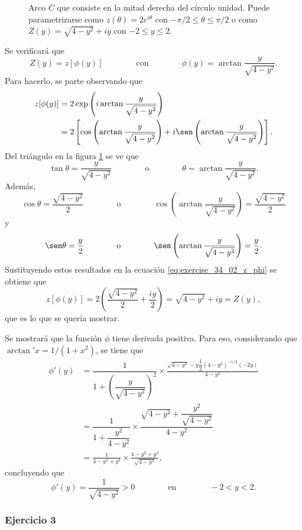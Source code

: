 \documentclass[a4paper]{report}
\begin{document}
\begin{figure}[!htb]
\begin{minipage}[c]{0.35\textwidth}
  \end{minipage}\hfill
  \begin{minipage}[c]{0.55\textwidth}
    \caption{
       Arco \(C\) que consiste en la mitad derecha del círculo unidad. Puede parametrizarse como \(z(\theta)=2e^{i\theta}\) con \(-\pi/2\leq\theta\leq\pi/2\) o como \(Z(y)=\sqrt{4-y^2}+iy\) con \(-2\leq y\leq2\).
    }\label{fig:exercise_43_02}
  \end{minipage}
\end{figure}

Se verificará que
\[
 Z(y)=z[\phi(y)]
 \qquad\qquad\textrm{con}\qquad\qquad
 \phi(y)=\arctan\frac{y}{\sqrt{4-y^2}}.
\]
Para hacerlo, se parte observando que 
\begin{align}
 z[\phi(y)]&=2\exp\left(i\arctan\frac{y}{\sqrt{4-y^2}}\right)\nonumber\\ 
  &=2\left[\cos\left(\arctan\frac{y}{\sqrt{4-y^2}}\right)+i\sen\left(\arctan\frac{y}{\sqrt{4-y^2}}\right)\right].\label{eq:exercise_34_02_z_phi}
\end{align}
Del triángulo en la figura \ref{fig:exercise_43_02} se ve que
\[
 \tan\theta=\frac{y}{\sqrt{4-y^2}}
 \qquad\qquad\textrm{o}\qquad\qquad
 \theta=\arctan\frac{y}{\sqrt{4-y^2}}.
\]
Además,
\[
 \cos\theta=\frac{\sqrt{4-y^2}}{2}
 \qquad\qquad\textrm{o}\qquad\qquad
 \cos\left(\arctan\frac{y}{\sqrt{4-y^2}}\right)=\frac{\sqrt{4-y^2}}{2}
\]
y
\[
 \sen\theta=\frac{y}{2}
 \qquad\qquad\textrm{o}\qquad\qquad
 \sen\left(\arctan\frac{y}{\sqrt{4-y^2}}\right)=\frac{y}{2}.
\]
Sustituyendo estos resultados en la ecuación \ref{eq:exercise_34_02_z_phi} se obtiene que 
\[
 z[\phi(y)]=2\left(\frac{\sqrt{4-y^2}}{2}+\frac{iy}{2}\right)
 =\sqrt{4-y^2}+iy=Z(y),
\]
que es lo que se quería mostrar.

Se mostrará que la función \(\phi\) tiene derivada positiva. Para eso, considerando que \(\arctan'x=1/(1+x^2)\), se tiene que 
\begin{align*}
 \phi'(y)&=\dfrac{1}{1+\left(\dfrac{y}{\sqrt{4-y^2}}\right)^2}\times
  \frac{\sqrt{4-y^2}-y\dfrac{1}{2}(4-y^2)^{-1/2}(-2y)}{4-y^2}\\
  &=\dfrac{1}{1+\dfrac{y^2}{4-y^2}}\times\dfrac{\sqrt{4-y^2}+\dfrac{y^2}{\sqrt{4-y^2}}}{4-y^2}\\
  &=\frac{1}{4-y^2+y^2}\times\frac{4-y^2+y^2}{\sqrt{4-y^2}},
\end{align*}
concluyendo que 
\[
 \phi'(y)=\frac{1}{\sqrt{4-y^2}}>0
 \qquad\qquad\textrm{en}\qquad\qquad
 -2<y<2.
\]

\subsubsection{Ejercicio 3}
\end{document}
